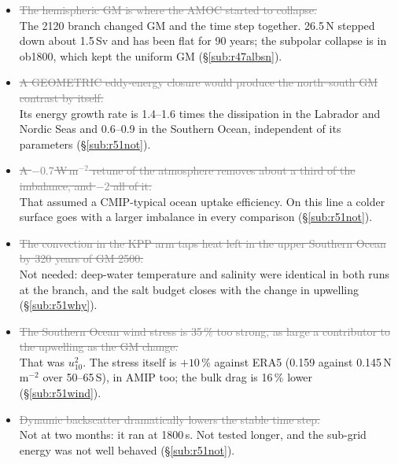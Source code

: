 \documentclass[10pt]{article}
\newcommand{\dead}[1]{\textcolor{gray}{\sout{#1}}}
\begin{document}
\begin{itemize}
\item \dead{The hemispheric GM is where the AMOC started to collapse.} \\ The 2120 branch changed GM
      and the time step together. 26.5\,N stepped down about 1.5\,Sv and has been flat for 90 years;
      the subpolar collapse is in ob1800, which kept the uniform GM (\S\ref{sub:r47albsn}).

\item \dead{A GEOMETRIC eddy-energy closure would produce the north--south GM contrast by itself.} \\
      Its energy growth rate is 1.4--1.6 times the dissipation in the Labrador and Nordic Seas and
      0.6--0.9 in the Southern Ocean, independent of its parameters (\S\ref{sub:r51not}).

\item \dead{A $-0.7$\,W\,m$^{-2}$ retune of the atmosphere removes about a third of the imbalance, and
      $-2$ all of it.} \\ That assumed a CMIP-typical ocean uptake efficiency. On this line a colder
      surface goes with a larger imbalance in every comparison (\S\ref{sub:r51not}).

\item \dead{The convection in the KPP arm taps heat left in the upper Southern Ocean by 320 years of
      GM 2500.} \\ Not needed: deep-water temperature and salinity were identical in both runs at the
      branch, and the salt budget closes with the change in upwelling (\S\ref{sub:r51why}).

\item \dead{The Southern Ocean wind stress is 35\,\% too strong, as large a contributor to the upwelling
      as the GM change.} \\ That was $u_{10}^2$. The stress itself is $+10$\,\% against ERA5 (0.159
      against 0.145\,N\,m$^{-2}$ over 50--65\,S), in AMIP too; the bulk drag is 16\,\% lower
      (\S\ref{sub:r51wind}).

\item \dead{Dynamic backscatter dramatically lowers the stable time step.} \\ Not at two months: it
      ran at 1800\,s. Not tested longer, and the sub-grid energy was not well behaved
      (\S\ref{sub:r51not}).

\end{itemize}
\end{document}
